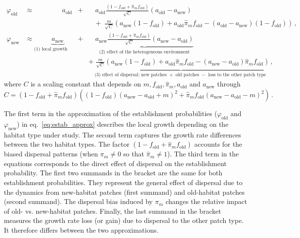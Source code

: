 \documentclass[11pt]{article}
\begin{document}
\begin{equation}\label{eq:estab_approx}
	\begin{aligned}
		\varphi_{\text{old}} &\approx \qquad \quad \; \; \; \; a_{\text{old}}&+ & \quad a_{\text{old}} \frac{\left(1-f_{\text{old}}+\widehat{\pi}_m f_{\text{old}}\right)}{\sqrt{C}}(a_{\text{old}}-a_{\text{new}}) \\
		& & &  \; \; \; + \; \frac{m}{\sqrt{C}} \left(a_{\text{new}}(1-f_{\text{old}}) + a_{\text{old}}\widehat{\pi}_m f_{\text{old}} - (a_{\text{old}}-a_{\text{new}})(1-f_{\text{old}})\right) \, ,\\
		\varphi_{\text{new}} &\approx \underbrace{ a_{\text{new}}}_{\text{(1) local growth parameter}} &+ & \quad \underbrace{ a_{\text{new}} \frac{\left(1-f_{\text{old}}+\widehat{\pi}_m f_{\text{old}}\right)}{\sqrt{C}}(a_{\text{new}}-a_{\text{old}})}_{\text{(2) effect of the heterogeneous environment}} \\
	& & &  \underbrace{+\; \frac{m}{\sqrt{C}}\left( a_{\text{new}}(1-f_{\text{old}}) + a_{\text{old}} \widehat{\pi}_m f_{\text{old}} - (a_{\text{new}}-a_{\text{old}}) \widehat{\pi}_m f_{\text{old}} \right)\, ,}_{\text{(3) effect of dispersal: new patches $+$ old patches $-$ loss to the other patch type }}
	\end{aligned}
\end{equation}
where $C$ is a scaling constant that depends on $m,f_{\text{old}},\widehat{\pi}_m,a_{\text{old}}$ and $a_{\text{new}}$ through
\begin{equation}\label{eq:normalization}
	C = (1-f_{\text{old}}+\widehat{\pi}_m f_{\text{old}}) \left((1-f_{\text{old}})(a_{\text{new}}-a_{\text{old}}+m)^2 + \widehat{\pi}_m f_{\text{old}} (a_{\text{new}}-a_{\text{old}}-m)^2\right)\, . 
\end{equation}

The first term in the approximation of the establishment probabilities ($\varphi_{\text{old}}$ and $\varphi_{\text{new}}$) in eq.~\eqref{eq:estab_approx} describes the local growth depending on the habitat type under study. 
The second term captures the growth rate differences between the two habitat types.
The factor $(1-f_{\text{old}}+\widehat{\pi}_m f_{\text{old}})$ accounts for the biased dispersal patterns (when $\pi_m\neq 0$ so that $\widehat{\pi}_m\neq 1$). 
The third term in the equations corresponds to the direct effect of dispersal on the establishment probability. 
The first two summands in the bracket are the same for both establishment probabilities. They represent the general effect of dispersal due to the dynamics from new-habitat patches (first summand) and old-habitat patches (second summand). The dispersal bias induced by $\pi_m$ changes the relative impact of old- vs. new-habitat patches. 
Finally, the last summand in the bracket measures the growth rate loss (or gain) due to dispersal to the other patch type. It therefore differs between the two approximations.
\end{document}
